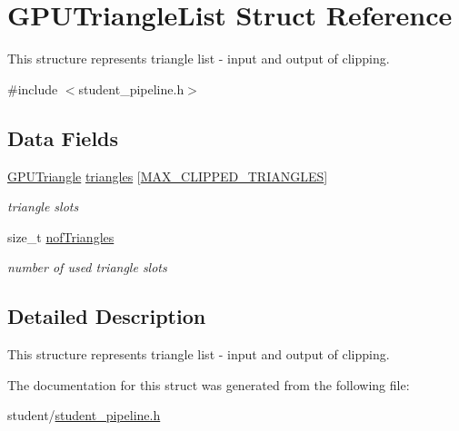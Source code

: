 \hypertarget{structGPUTriangleList}{\section{G\-P\-U\-Triangle\-List Struct Reference}
\label{structGPUTriangleList}
}


This structure represents triangle list -\/ input and output of clipping.  




{\ttfamily \#include $<$student\-\_\-pipeline.\-h$>$}

\subsection*{Data Fields}
\begin{DoxyCompactItemize}
\item 
\hypertarget{structGPUTriangleList_a82e236c3dae30c59dfedd12105bd71a9}{\hyperlink{structGPUTriangle}{G\-P\-U\-Triangle} \hyperlink{structGPUTriangleList_a82e236c3dae30c59dfedd12105bd71a9}{triangles} \mbox{[}\hyperlink{fwd_8h_a50521856e491931b63ecbaa2f90837ec}{M\-A\-X\-\_\-\-C\-L\-I\-P\-P\-E\-D\-\_\-\-T\-R\-I\-A\-N\-G\-L\-E\-S}\mbox{]}}\label{structGPUTriangleList_a82e236c3dae30c59dfedd12105bd71a9}

\begin{DoxyCompactList}\small\item\em triangle slots \end{DoxyCompactList}\item 
\hypertarget{structGPUTriangleList_a8bab6c6758e097060186e69fa1560494}{size\-\_\-t \hyperlink{structGPUTriangleList_a8bab6c6758e097060186e69fa1560494}{nof\-Triangles}}\label{structGPUTriangleList_a8bab6c6758e097060186e69fa1560494}

\begin{DoxyCompactList}\small\item\em number of used triangle slots \end{DoxyCompactList}\end{DoxyCompactItemize}


\subsection{Detailed Description}
This structure represents triangle list -\/ input and output of clipping. 

The documentation for this struct was generated from the following file\-:\begin{DoxyCompactItemize}
\item 
student/\hyperlink{student__pipeline_8h}{student\-\_\-pipeline.\-h}\end{DoxyCompactItemize}

